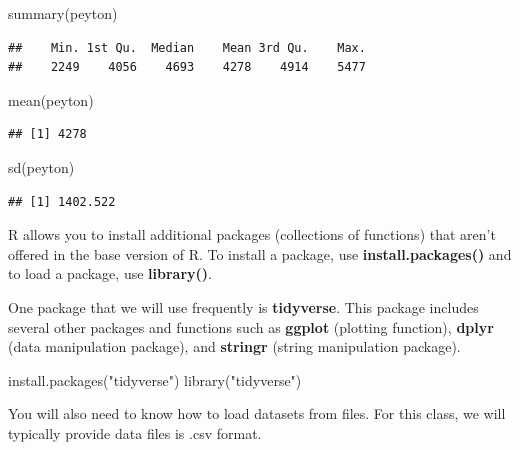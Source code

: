 \documentclass[
]{book}
\newenvironment{Shaded}{\begin{snugshade}}{\end{snugshade}}
\newcommand{\FunctionTok}[1]{\textcolor[rgb]{0.00,0.00,0.00}{#1}}
\newcommand{\NormalTok}[1]{#1}
\newcommand{\StringTok}[1]{\textcolor[rgb]{0.31,0.60,0.02}{#1}}
\theoremstyle{definition}
\theoremstyle{definition}
\theoremstyle{definition}
\theoremstyle{definition}
\theoremstyle{remark}
\begin{document}
\begin{Shaded}
\begin{Highlighting}[]
\FunctionTok{summary}\NormalTok{(peyton)}
\end{Highlighting}
\end{Shaded}

\begin{verbatim}
##    Min. 1st Qu.  Median    Mean 3rd Qu.    Max. 
##    2249    4056    4693    4278    4914    5477
\end{verbatim}

\begin{Shaded}
\begin{Highlighting}[]
\FunctionTok{mean}\NormalTok{(peyton)}
\end{Highlighting}
\end{Shaded}

\begin{verbatim}
## [1] 4278
\end{verbatim}

\begin{Shaded}
\begin{Highlighting}[]
\FunctionTok{sd}\NormalTok{(peyton)}
\end{Highlighting}
\end{Shaded}

\begin{verbatim}
## [1] 1402.522
\end{verbatim}

R allows you to install additional packages (collections of functions) that aren't offered in the base version of R. To install a package, use \textbf{install.packages()} and to load a package, use \textbf{library()}.

One package that we will use frequently is \textbf{tidyverse}. This package includes several other packages and functions such as \textbf{ggplot} (plotting function), \textbf{dplyr} (data manipulation package), and \textbf{stringr} (string manipulation package).

\begin{Shaded}
\begin{Highlighting}[]
\FunctionTok{install.packages}\NormalTok{(}\StringTok{"tidyverse"}\NormalTok{)}
\FunctionTok{library}\NormalTok{(}\StringTok{"tidyverse"}\NormalTok{)}
\end{Highlighting}
\end{Shaded}

You will also need to know how to load datasets from files. For this class, we will typically provide data files is .csv format.
\end{document}

